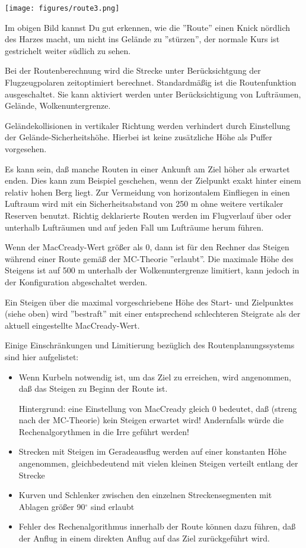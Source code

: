 \begin{center}
\texttt{[image: figures/route3.png]}
\end{center}

Im obigen Bild kannst Du gut erkennen, wie die ''Route'' einen Knick nördlich des Harzes macht, um nicht ins Gelände zu ''stürzen'', der normale Kurs ist gestrichelt weiter südlich zu sehen. 

Bei der Routenberechnung wird die Strecke unter Berücksichtgung der Flugzeugpolaren zeitoptimiert berechnet. Standardmäßig ist die Routenfunktion ausgeschaltet. Sie kann aktiviert werden unter   Berücksichtigung von Lufträumen, Gelände, Wolkenuntergrenze.

Geländekollisionen in vertikaler Richtung werden verhindert durch Einstellung der Gelände-Sicherheitshöhe.  Hierbei ist keine zusätzliche Höhe als Puffer vorgesehen.

Es kann sein, daß manche Routen in einer Ankunft am Ziel höher als erwartet enden. Dies kann zum Beispiel geschehen, wenn der Zielpunkt exakt hinter einem relativ hohen Berg liegt. Zur Vermeidung von horizontalem Einfliegen in einen Luftraum wird mit ein Sicherheitsabstand von 250 m ohne weitere vertikaler Reserven benutzt.
Richtig deklarierte Routen werden im Flugverlauf über oder unterhalb Lufträumen und auf jeden Fall um Lufträume herum führen.

\warning
Wenn der MacCready-Wert größer als 0, dann ist für den Rechner das Steigen während einer Route gemäß der MC-Theorie ''erlaubt''.   Die maximale Höhe des Steigens  ist auf  500 m unterhalb der Wolkenuntergrenze limitiert, kann jedoch in der Konfiguration abgeschaltet werden.

Ein Steigen über die maximal vorgeschriebene Höhe des Start- und Zielpunktes (siehe oben) wird ''bestraft'' mit einer entsprechend schlechteren Steigrate als der aktuell eingestellte MacCready-Wert. 


Einige Einschränkungen und Limitierung bezüglich des Routenplanungssystems sind hier aufgelistet:

\begin{itemize}
\item Wenn Kurbeln notwendig ist, um das Ziel zu erreichen,  wird angenommen, daß das Steigen zu Beginn der Route ist. 

Hintergrund: eine Einstellung von  MacCready gleich 0 bedeutet, daß (streng nach der MC-Theorie) kein Steigen erwartet wird!  Andernfalls würde die Rechenalgorythmen in  die Irre geführt werden!   
\item Strecken mit Steigen im Geradeausflug werden auf einer konstanten Höhe angenommen, gleichbedeutend mit vielen kleinen Steigen verteilt entlang der Strecke
\item Kurven und Schlenker zwischen den einzelnen Streckensegmenten mit Ablagen größer 90$^\circ$ sind erlaubt
\item Fehler des Rechenalgorithmus innerhalb der Route können dazu führen, daß der Anflug in einem direkten Anflug auf das Ziel zurückgeführt wird.
\end{itemize}


